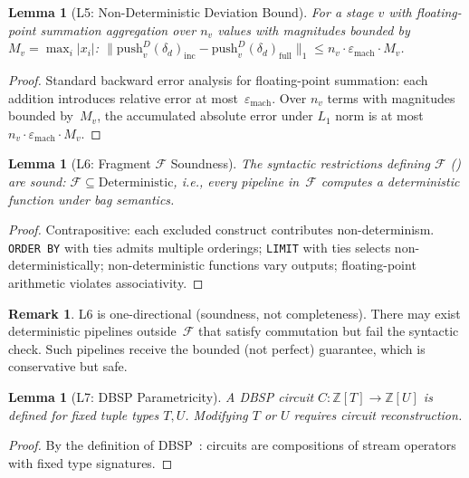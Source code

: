 \documentclass[11pt,a4paper]{article}
\newtheorem{lemma}[theorem]{Lemma}
\theoremstyle{definition}
\newtheorem{remark}[theorem]{Remark}
\newcommand{\push}{\mathrm{push}}
\newcommand{\FragF}{\mathcal{F}}
\newcommand{\emach}{\varepsilon_{\mathrm{mach}}}
\begin{document}
\begin{lemma}[L5: Non-Deterministic Deviation Bound]\label{lem:nd-deviation}
For a stage $v$ with floating-point summation aggregation over $n_v$ values
with magnitudes bounded by $M_v = \max_i |x_i|$:
$\|\push_v^D(\delta_d)_{\mathrm{inc}} - \push_v^D(\delta_d)_{\mathrm{full}}\|_1
\leq n_v \cdot \emach \cdot M_v$.
\end{lemma}
\begin{proof}
Standard backward error analysis for floating-point summation: each addition
introduces relative error at most~$\emach$.  Over $n_v$ terms with magnitudes
bounded by~$M_v$, the accumulated absolute error under $L_1$ norm is at most
$n_v \cdot \emach \cdot M_v$.
\end{proof}

\begin{lemma}[L6: Fragment $\FragF$ Soundness]\label{lem:fragment-sound}
The syntactic restrictions defining $\FragF$ () are
\emph{sound}: $\FragF \subseteq \mathrm{Deterministic}$, i.e., every pipeline
in~$\FragF$ computes a deterministic function under bag semantics.
\end{lemma}
\begin{proof}
Contrapositive: each excluded construct contributes non-determinism.
\texttt{ORDER BY} with ties admits multiple orderings; \texttt{LIMIT} with
ties selects non-deterministically; non-deterministic functions vary outputs;
floating-point arithmetic violates associativity.
\end{proof}

\begin{remark}
L6 is one-directional (soundness, not completeness).  There may exist
deterministic pipelines outside~$\FragF$ that satisfy commutation but fail
the syntactic check.  Such pipelines receive the bounded (not perfect)
guarantee, which is conservative but safe.
\end{remark}

\begin{lemma}[L7: DBSP Parametricity]\label{lem:dbsp-parametric}
A DBSP circuit $C\colon \mathbb{Z}[T] \to \mathbb{Z}[U]$ is defined for
fixed tuple types $T, U$.  Modifying $T$ or $U$ requires circuit reconstruction.
\end{lemma}
\begin{proof}
By the definition of DBSP~\cite{budiu2023dbsp}: circuits are compositions of
stream operators with fixed type signatures.
\end{proof}
\end{document}
